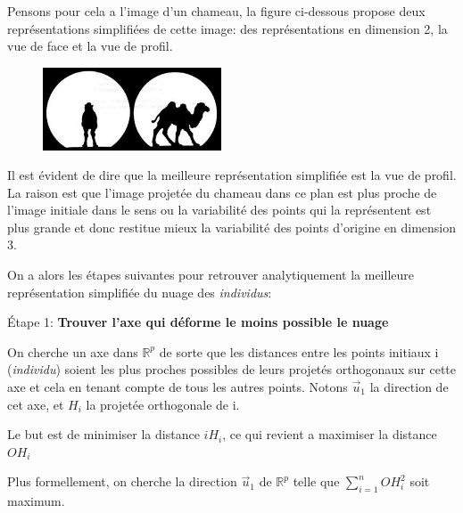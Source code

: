 \documentclass{article}
\begin{document}
Pensons pour cela a l’image d’un chameau, la figure ci-dessous propose deux représentations simplifiées de cette image: des représentations en dimension 2, la vue de face et la vue de profil.

\begin{figure}[h!]
\centering
\includegraphics[width=200px]{images/chameau.png}
\end{figure}

Il est évident de dire que la meilleure représentation simplifiée est la vue de profil. La raison est que l’image projetée du chameau dans ce plan est plus proche de l’image initiale dans le sens ou la variabilité des points qui la représentent est plus grande et donc restitue mieux la variabilité des points d’origine en dimension 3.
\newline

On a alors les étapes suivantes pour retrouver analytiquement la meilleure représentation simplifiée du nuage des \textit{individus}:

\begin{flushleft}
Étape 1: \textbf{Trouver l'axe qui déforme le moins possible le nuage}
\end{flushleft}

On cherche un axe dans $\mathbb{R}^p$ de sorte que les distances entre les points initiaux i (\textit{individu}) soient les plus proches possibles de leurs projetés orthogonaux sur cette axe et cela en tenant compte de tous les autres points. Notons $\vec{u}_1$ la direction de cet axe, et $H_i$ la projetée orthogonale de i.
\newline


Le but est de minimiser la distance $iH_i$, ce qui revient a maximiser la distance $OH_i$
\newline

Plus formellement, on cherche la direction $\vec{u}_1$ de $\mathbb{R}^p$ telle que $\sum_{i=1}^n OH_i^2$ soit maximum.
\newline
\end{document}
